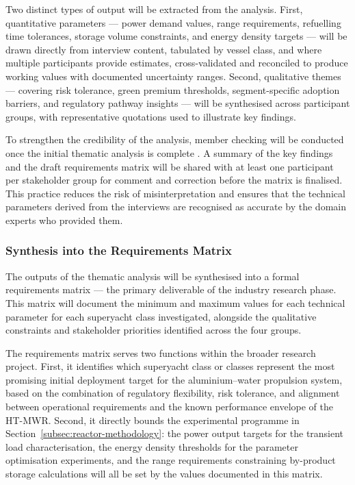 \documentclass[12pt]{article}
\begin{document}
Two distinct types of output will be extracted from the analysis. First, 
quantitative parameters --- power demand values, range requirements, refuelling time 
tolerances, storage volume constraints, and energy density targets --- will be drawn 
directly from interview content, tabulated by vessel class, and where multiple 
participants provide estimates, cross-validated and reconciled to produce working 
values with documented uncertainty ranges. Second, qualitative themes --- covering 
risk tolerance, green premium thresholds, segment-specific adoption barriers, and 
regulatory pathway insights --- will be synthesised across participant groups, with 
representative quotations used to illustrate key findings.

To strengthen the credibility of the analysis, member checking will be conducted 
once the initial thematic analysis is complete \cite{miles2014}. A summary of the 
key findings and the draft requirements matrix will be shared with at least one 
participant per stakeholder group for comment and correction before the matrix is 
finalised. This practice reduces the risk of misinterpretation and ensures that the 
technical parameters derived from the interviews are recognised as accurate by the 
domain experts who provided them.

\subsubsection*{Synthesis into the Requirements Matrix}

The outputs of the thematic analysis will be synthesised into a formal requirements 
matrix --- the primary deliverable of the industry research phase. This matrix will 
document the minimum and maximum values for each technical parameter for each 
superyacht class investigated, alongside the qualitative constraints and stakeholder 
priorities identified across the four groups.

The requirements matrix serves two functions within the broader research project. 
First, it identifies which superyacht class or classes represent the most promising 
initial deployment target for the aluminium--water propulsion system, based on the 
combination of regulatory flexibility, risk tolerance, and alignment between 
operational requirements and the known performance envelope of the HT-MWR. Second, 
it directly bounds the experimental programme in 
Section~\ref{subsec:reactor-methodology}: the power output targets for the transient 
load characterisation, the energy density thresholds for the parameter optimisation 
experiments, and the range requirements constraining by-product storage calculations 
will all be set by the values documented in this matrix.
\end{document}
